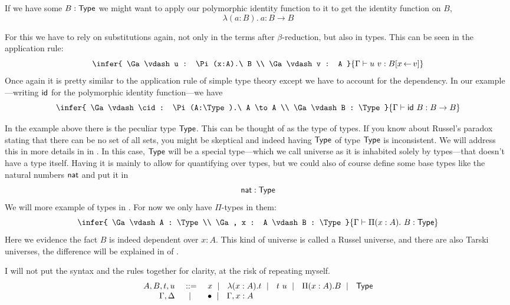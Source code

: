 If we have some \(B : \mathsf{Type}\) we might want to apply our polymorphic identity
function to it to get the identity function on \(B\), \ie
\[
  \lambda (a:B).\ a : B \to B
\]

For this we have to rely on substitutions again, not only in the terms after
\(\beta\)-reduction, but also in types.
This can be seen in the application rule:
\[
  \infer
    {
      \Ga \vdash u : \Pi (x:A).\ B \\
      \Ga \vdash v : A
    }
    {\Ga \vdash u\ v : B[x \sto v]}
\]
Once again it is pretty similar to the application rule of simple type theory
except we have to account for the dependency. In our example---writing \(\mathsf{id}\)
for the polymorphic identity function---we have
\[
  \infer
    {
      \Ga \vdash \cid : \Pi (A:\Type).\ A \to A \\
      \Ga \vdash B : \Type
    }
    {\Ga \vdash \cid\ B : B \to B}
\]


In the example above there is the peculiar type \(\mathsf{Type}\).
This can be thought of as the type of types. If you know about Russel's paradox
stating that there can be no set of all sets, you might be skeptical and indeed
having \(\mathsf{Type}\) of type \(\mathsf{Type}\) is inconsistent.
We will address this in more details in  in
.
In this case, \(\mathsf{Type}\) will be a special type---which we call universe as it
is inhabited solely by types---that doesn't have a type itself.
Having it is mainly to allow for quantifying over types, but we could also of
course define some base types like the natural numbers \(\mathsf{nat}\) and put it in
\[
  \mathsf{nat} : \mathsf{Type}
\]
We will more example of types in . For now we only have
\(\Pi\)-types in them:
\[
  \infer
    {
      \Ga \vdash A : \Type \\
      \Ga, x : A \vdash B : \Type
    }
    {\Ga \vdash \Pi (x:A).\ B : \Type}
\]
Here we evidence the fact \(B\) is indeed dependent over \(x : A\).
This kind of universe is called a Russel universe, and there are also Tarski
universes, the difference will be explained in 
of .

I will not put the syntax and the rules together for clarity, at the risk of
repeating myself.
\[
  \begin{array}{rcl}
    A, B, t, u &\ \mathrel{{:}{:}{=}}\ & x \ \mid\ \  \lambda (x:A).t \ \mid\ \  t\ u \ \mid\ \  \Pi (x:A). B
    \ \mid\ \  \mathsf{Type} \\
    \Gamma, \Delta &\ \mid\ \ & \bullet \ \mid\ \  \Gamma, x:A
  \end{array}
\]

